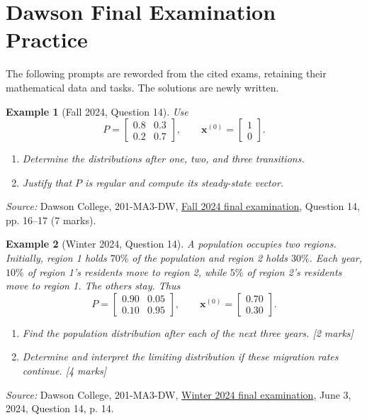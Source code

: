 \documentclass{article}
\theoremstyle{plain}
\newtheorem{example}{Example}[section]
\theoremstyle{definition}
\theoremstyle{remark}
\renewcommand{\vec}[1]{\mathbf{#1}}
\newcommand{\work}{\par\vfill}
\begin{document}
\section{Dawson Final Examination Practice}
The following prompts are reworded from the cited exams, retaining their mathematical data and tasks. The solutions are newly written.
\begin{example}[Fall 2024, Question 14]\label{ex:dawsonfallmarkov}
Use
\[
P=\begin{bmatrix}0.8&0.3\\0.2&0.7\end{bmatrix},\qquad\vec{x}^{(0)}=\begin{bmatrix}1\\0\end{bmatrix}.
\]
\begin{enumerate}
\item[(a)] Determine the distributions after one, two, and three transitions.
\item[(b)] Justify that $P$ is regular and compute its steady-state vector.
\end{enumerate}
\end{example}
{\small\textit{Source:} Dawson College, 201-MA3-DW, \href{https://www.dawsoncollege.qc.ca/mathematics/wp-content/uploads/sites/113/Fall-2024-3.pdf}{Fall 2024 final examination}, Question 14, pp. 16--17 (7 marks).}

\work

\newpage
\begin{example}[Winter 2024, Question 14]\label{ex:dawsonwintermarkov}
A population occupies two regions. Initially, region 1 holds $70\%$ of the population and region 2 holds $30\%$. Each year, $10\%$ of region 1's residents move to region 2, while $5\%$ of region 2's residents move to region 1. The others stay. Thus
\[
P=\begin{bmatrix}0.90&0.05\\0.10&0.95\end{bmatrix},\qquad
\vec{x}^{(0)}=\begin{bmatrix}0.70\\0.30\end{bmatrix}.
\]
\begin{enumerate}
\item[(a)] Find the population distribution after each of the next three years. \hfill [2 marks]
\item[(b)] Determine and interpret the limiting distribution if these migration rates continue. \hfill [4 marks]
\end{enumerate}
\end{example}
{\small\textit{Source:} Dawson College, 201-MA3-DW, \href{https://www.dawsoncollege.qc.ca/mathematics/wp-content/uploads/sites/113/Winter-2024-3.pdf}{Winter 2024 final examination}, June 3, 2024, Question 14, p. 14.}

\work
\end{document}
